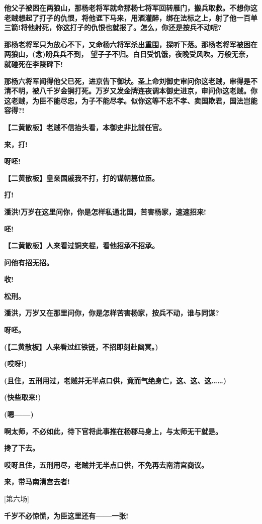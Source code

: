 \textbf{他父子被困在两狼山，那杨老将军就命那杨七将军回转雁门，搬兵取救。不想你这老贼想起了打子的仇恨，将他诓下马来，用酒灌醉，绑在法标之上，射了他一百单三箭!将他射死，你这打子的仇恨也就报了。怎么，你还是按兵不动呢?}

\textbf{那杨老将军只为放心不下，又命杨六将军杀出重围，探听下落。那杨老将军被困在两狼山，(念)盼兵兵不到，
望子子不归。白日受饥饿，夜晚受风吹。万般无奈，就碰死在李陵碑下!}

\textbf{那杨六将军闻得他父已死，进京告下御状。圣上命刘御史审问你这老贼，审得是不清不明，被八千岁金锏打死。万岁又发金牌连夜调本御史进京，审问你这老贼。你这老贼，为臣不能尽忠，为子不能尽孝。似你这等不忠不孝、卖国欺君，国法岂能容得?!}

\textbf{【二黄散板】老贼不信抬头看，本御史非比前任官。}

\textbf{来，打!}

\textbf{呀呸!}

\textbf{【二黄散板】皇亲国戚我不打，打的谋朝篡位臣。}

\textbf{打!}

\textbf{潘洪!万岁在这里问你，你是怎样私通北国，苦害杨家，速速招来!}

\textbf{呸!}

\textbf{【二黄散板】人来看过铜夹棍，看他招承不招承。}

\textbf{问他有招无招。}

\textbf{收!}

\textbf{松刑。}

\textbf{潘洪，万岁又在那里问你，你是怎样苦害杨家，按兵不动，谁与同谋?}

\textbf{呀呸。}

\textbf{(【二黄散板】人来看过红铁链，不招即刻赴幽冥。)}

\textbf{(哎呀!)}

\textbf{(且住，五刑用过，老贼并无半点口供，竟而气绝身亡，这、这、这\ldots{}\ldots{})}

\textbf{(快些取来!)}

\textbf{(嗯------)}

\textbf{啊太师，不必如此，待下官将此事推在杨郡马身上，与太师无干就是。}

\textbf{搀了下去。}

\textbf{哎呀且住，五刑用尽，老贼并无半点口供，不免再去南清宫商议。}

\textbf{来，带马南清宫去者!}

{[}第六场{]}

\textbf{千岁不必惊慌，为臣这里还有------一张!}

